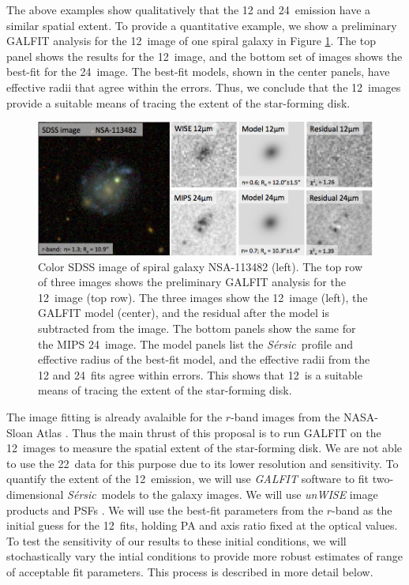 \documentclass[12pt, preprint]{aastex}
\newcommand{\sers}{{\it S\'{e}rsic}}
\begin{document}
{The above examples show qualitatively that the 12 and 24\micron \ emission
have a similar spatial extent.  To provide a quantitative example, 
we show a preliminary GALFIT analysis for the 12\micron \ image of one spiral
galaxy in Figure \ref{nsa113482}.  The top panel shows the results for
the 12\micron \ image, and the bottom set of images shows the best-fit
for the 24\micron \ image.  The best-fit models, shown in the center
panels, have effective radii that agree within the errors.  Thus, we
conclude that the
12\micron \ images provide a suitable means of tracing the extent of
the star-forming disk.   

\begin{figure}[h]
\begin{center}
\includegraphics[width=.85\textwidth]{NSA-113482.png}
\end{center}
\caption{ Color SDSS image of spiral galaxy NSA-113482 (left).  The top
  row of three images shows the preliminary GALFIT
  analysis for the 12\micron \ image (top row).  The three images show
the 12\micron \ image (left), the GALFIT model (center), and the
residual after the model is subtracted from the image.  The bottom
panels show the same for the MIPS 24\micron \ image.  The model panels
list the \sers \ profile and effective radius of the best-fit model,
and the effective radii from the 12 and 24\micron \ fits agree within
errors.  This shows that 12\micron \ is a suitable means of tracing
the extent of the star-forming disk.}
\label{nsa113482}
\end{figure}



The image fitting is already avalaible for the $r$-band images from
the NASA-Sloan Atlas \citep{blanton11}.  Thus the main thrust of this proposal is to run
GALFIT on the 12\micron \ images to measure the spatial extent of the
star-forming disk.  We are not able to use the 22\micron \ data for
this purpose due to
its lower resolution and sensitivity.
To quantify the extent of the 12\micron \ emission, 
we will use  {\it GALFIT} software \citep{peng02}
to fit two-dimensional \sers \ models to the galaxy images.  
We will use {\it unWISE} image products and PSFs \citep{lang14}.
We will use the best-fit parameters from the $r$-band as the initial
guess for the 12\micron \ fits, holding PA and axis ratio fixed at the
optical values.  To test the sensitivity of our results to these
initial conditions, we will stochastically vary  the intial
conditions to provide more robust estimates of range of acceptable
fit parameters.  This process is described in more detail below.

}
\end{document}
